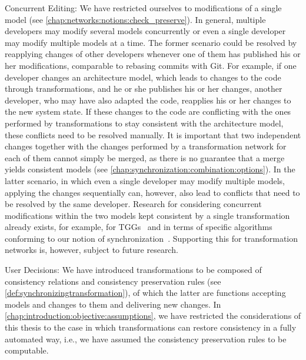 \begin{properdescription}
\item[Concurrent Editing:] 
We have restricted ourselves to modifications of a single model (see \autoref{chap:networks:notions:check_preserve}). 
In general, multiple developers may modify several models concurrently or even a single developer may modify multiple models at a time.
The former scenario could be resolved by reapplying changes of other developers whenever one of them has published his or her modifications, comparable to rebasing commits with Git.
For example, if one developer changes an architecture model, which leads to changes to the code through transformations, and he or she publishes his or her changes, another developer, who may have also adapted the code, reapplies his or her changes to the new system state.
If these changes to the code are conflicting with the ones performed by transformations to stay consistent with the architecture model, these conflicts need to be resolved manually.
It is important that two independent changes together with the changes performed by a transformation network for each of them cannot simply be merged, as there is no guarantee that a merge yields consistent models (see \autoref{chap:synchronization:combination:options}).
In the latter scenario, in which even a single developer may modify multiple models, applying the changes sequentially can, however, also lead to conflicts that need to be resolved by the same developer.
Research for considering concurrent modifications within the two models kept consistent by a single transformation already exists, for example, for \glspl{TGG}~\cite{hermann2012concurrentSynchronization-FASE,orejas2020IncrementalConcurrentSynchronization-FASE} and in terms of specific algorithms conforming to our notion of synchronization~\cite{xiong2013SynchronizingConcurrentUpdates-SoSym,xiong2009parallelUpdates-ICMT}.
Supporting this for transformation networks is, however, subject to future research.
\item[User Decisions:]
We have introduced transformations to be composed of consistency relations and consistency preservation rules (see \autoref{def:synchronizingtransformation}), of which the latter are functions accepting models and changes to them and delivering new changes.
In \autoref{chap:introduction:objective:assumptions}, we have restricted the considerations of this thesis to the case in which transformations can restore consistency in a fully automated way, i.e., we have assumed the consistency preservation rules to be computable.

\end{properdescription}

